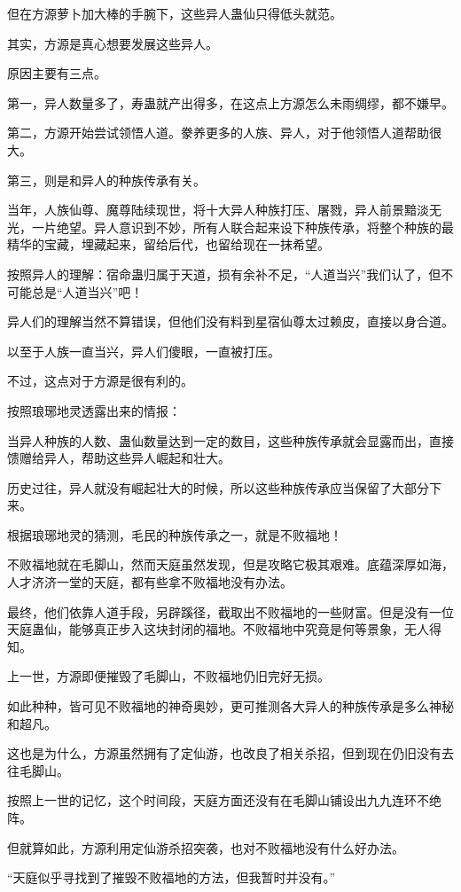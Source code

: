\begin{this_body}
但在方源萝卜加大棒的手腕下，这些异人蛊仙只得低头就范。

其实，方源是真心想要发展这些异人。

原因主要有三点。

第一，异人数量多了，寿蛊就产出得多，在这点上方源怎么未雨绸缪，都不嫌早。

第二，方源开始尝试领悟人道。豢养更多的人族、异人，对于他领悟人道帮助很大。

第三，则是和异人的种族传承有关。

当年，人族仙尊、魔尊陆续现世，将十大异人种族打压、屠戮，异人前景黯淡无光，一片绝望。异人意识到不妙，所有人联合起来设下种族传承，将整个种族的最精华的宝藏，埋藏起来，留给后代，也留给现在一抹希望。

按照异人的理解：宿命蛊归属于天道，损有余补不足，“人道当兴”我们认了，但不可能总是“人道当兴”吧！

异人们的理解当然不算错误，但他们没有料到星宿仙尊太过赖皮，直接以身合道。

以至于人族一直当兴，异人们傻眼，一直被打压。

不过，这点对于方源是很有利的。

按照琅琊地灵透露出来的情报：

当异人种族的人数、蛊仙数量达到一定的数目，这些种族传承就会显露而出，直接馈赠给异人，帮助这些异人崛起和壮大。

历史过往，异人就没有崛起壮大的时候，所以这些种族传承应当保留了大部分下来。

根据琅琊地灵的猜测，毛民的种族传承之一，就是不败福地！

不败福地就在毛脚山，然而天庭虽然发现，但是攻略它极其艰难。底蕴深厚如海，人才济济一堂的天庭，都有些拿不败福地没有办法。

最终，他们依靠人道手段，另辟蹊径，截取出不败福地的一些财富。但是没有一位天庭蛊仙，能够真正步入这块封闭的福地。不败福地中究竟是何等景象，无人得知。

上一世，方源即便摧毁了毛脚山，不败福地仍旧完好无损。

如此种种，皆可见不败福地的神奇奥妙，更可推测各大异人的种族传承是多么神秘和超凡。

这也是为什么，方源虽然拥有了定仙游，也改良了相关杀招，但到现在仍旧没有去往毛脚山。

按照上一世的记忆，这个时间段，天庭方面还没有在毛脚山铺设出九九连环不绝阵。

但就算如此，方源利用定仙游杀招突袭，也对不败福地没有什么好办法。

“天庭似乎寻找到了摧毁不败福地的方法，但我暂时并没有。”


\end{this_body}
